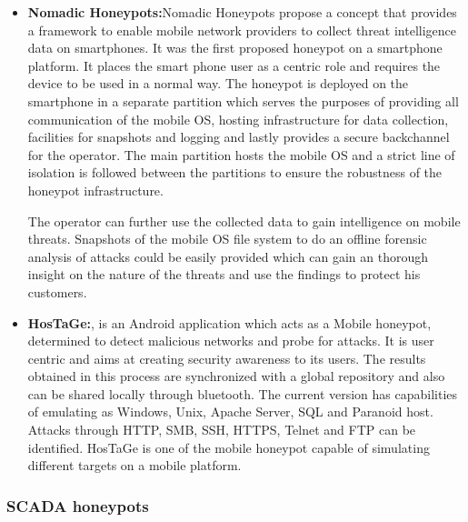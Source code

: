 \documentclass[article,msc=informatik,type=msc,colorback,accentcolor=tud9c]{tudthesis}
\begin{document}
\begin{itemize}
	\item\textbf{Nomadic Honeypots:}Nomadic Honeypots \cite{Liebergeld_nomadichoneypots:} propose a concept that provides a framework to enable mobile network providers to collect threat intelligence data on smartphones. It was the first proposed honeypot on a smartphone platform. It places the smart phone user as a centric role and requires the device to be used in a normal way. The honeypot is deployed on the smartphone in a separate partition which serves the purposes of providing all communication of the mobile OS, hosting infrastructure for data collection, facilities for snapshots and logging and lastly provides a secure backchannel for the operator. The main partition hosts the mobile OS and a strict line of isolation is followed between the partitions to ensure the robustness of the honeypot infrastructure. 
	\vspace{3mm}
	
	The operator can further use the collected data to gain intelligence on mobile threats. Snapshots of the mobile OS file system to do an offline forensic analysis of attacks could be easily provided which can gain an thorough insight on the nature of the threats and use the findings to protect his customers.

	\item\textbf{HosTaGe:}\cite{Vasilomanolakis:2013:TNI:2516760.2516763},\cite{Vasilomanolakis:2014:HMH:2659651.2659663} is an Android application which acts as a Mobile honeypot, determined to detect malicious networks and probe for attacks. It is user centric and aims at creating security awareness to its users. The results obtained in this process are synchronized with a global repository and also can be shared locally through bluetooth. The current version has capabilities of emulating as Windows, Unix, Apache Server, \ac{SQL} and Paranoid host. Attacks through HTTP, \ac{SMB}, \ac{SSH}, \ac{HTTPS}, Telnet and \ac{FTP} can be identified.  HosTaGe is one of the mobile honeypot capable of simulating different targets on a mobile platform. 
	
	\end{itemize}   
	
	
	
      
   \vspace{5mm}          
   \subsubsection{SCADA honeypots} \label{SCADA honeypots}
\end{document}
